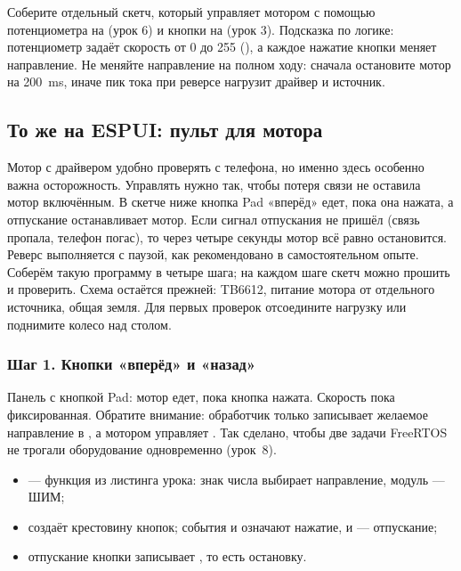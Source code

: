Соберите отдельный скетч, который управляет мотором с помощью потенциометра на  (урок 6) и кнопки на
 (урок 3). Подсказка по логике: потенциометр задаёт скорость от 0 до 255 (), а каждое нажатие кнопки
меняет направление. Не меняйте направление на полном ходу: сначала остановите мотор на \SI{200}{ms}, иначе пик тока при
реверсе нагрузит драйвер и источник.

\subsection{То же на ESPUI: пульт для мотора}

Мотор с драйвером удобно проверять с телефона, но именно здесь особенно важна осторожность.
Управлять нужно так, чтобы потеря связи не оставила мотор включённым. В скетче ниже кнопка
Pad «вперёд» едет, пока она нажата, а отпускание останавливает мотор. Если сигнал отпускания
не пришёл (связь пропала, телефон погас), то через четыре секунды мотор всё равно остановится.
Реверс выполняется с паузой, как рекомендовано в самостоятельном опыте. Соберём такую программу в
четыре шага; на каждом шаге скетч можно прошить и проверить. Схема остаётся прежней: TB6612, питание
мотора от отдельного источника, общая земля. Для первых проверок отсоедините нагрузку или поднимите колесо над столом.

\subsubsection{Шаг 1. Кнопки «вперёд» и «назад»}

Панель с кнопкой Pad: мотор едет, пока кнопка нажата. Скорость пока фиксированная. Обратите внимание:
обработчик  только записывает желаемое направление в , а мотором
управляет . Так сделано, чтобы две задачи FreeRTOS не трогали оборудование одновременно (урок~8).


\begin{itemize}[leftmargin=*]
  \item {} --- функция из листинга урока: знак числа выбирает направление, модуль --- ШИМ;
  \item {} создаёт крестовину кнопок; события  и 
        означают нажатие,  и  --- отпускание;
  \item отпускание кнопки записывает , то есть остановку.
\end{itemize}

